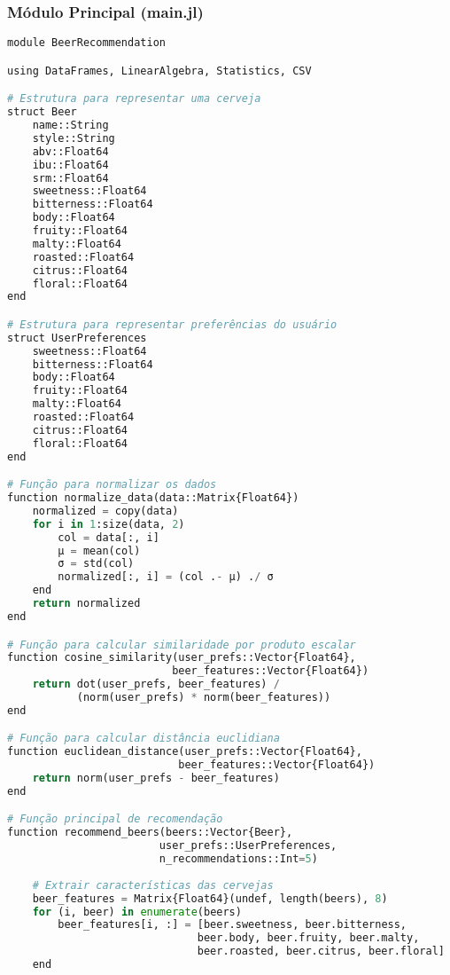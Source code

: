 \documentclass[12pt,a4paper]{article}
\begin{document}
\subsubsection{Módulo Principal (main.jl)}

\begin{lstlisting}[language=Python, caption=Código principal do sistema de recomendação]
module BeerRecommendation

using DataFrames, LinearAlgebra, Statistics, CSV

# Estrutura para representar uma cerveja
struct Beer
    name::String
    style::String
    abv::Float64
    ibu::Float64
    srm::Float64
    sweetness::Float64
    bitterness::Float64
    body::Float64
    fruity::Float64
    malty::Float64
    roasted::Float64
    citrus::Float64
    floral::Float64
end

# Estrutura para representar preferências do usuário
struct UserPreferences
    sweetness::Float64
    bitterness::Float64
    body::Float64
    fruity::Float64
    malty::Float64
    roasted::Float64
    citrus::Float64
    floral::Float64
end

# Função para normalizar os dados
function normalize_data(data::Matrix{Float64})
    normalized = copy(data)
    for i in 1:size(data, 2)
        col = data[:, i]
        μ = mean(col)
        σ = std(col)
        normalized[:, i] = (col .- μ) ./ σ
    end
    return normalized
end

# Função para calcular similaridade por produto escalar
function cosine_similarity(user_prefs::Vector{Float64}, 
                          beer_features::Vector{Float64})
    return dot(user_prefs, beer_features) / 
           (norm(user_prefs) * norm(beer_features))
end

# Função para calcular distância euclidiana
function euclidean_distance(user_prefs::Vector{Float64}, 
                           beer_features::Vector{Float64})
    return norm(user_prefs - beer_features)
end

# Função principal de recomendação
function recommend_beers(beers::Vector{Beer}, 
                        user_prefs::UserPreferences, 
                        n_recommendations::Int=5)
    
    # Extrair características das cervejas
    beer_features = Matrix{Float64}(undef, length(beers), 8)
    for (i, beer) in enumerate(beers)
        beer_features[i, :] = [beer.sweetness, beer.bitterness, 
                              beer.body, beer.fruity, beer.malty, 
                              beer.roasted, beer.citrus, beer.floral]
    end
    

\end{lstlisting}
\end{document}
